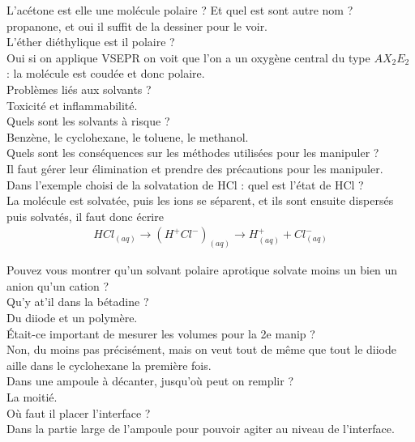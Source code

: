 \documentclass[12pt,prb,aps,epsf]{article}
\begin{document}
L'acétone est elle une molécule polaire ? Et quel est sont autre nom ?\\
propanone, et oui il suffit de la dessiner pour le voir.\\

L'éther diéthylique est il polaire ?\\
Oui si on applique VSEPR on voit que l'on a un oxygène central du type $AX_2E_2$ : la molécule est coudée et donc polaire.\\

Problèmes liés aux solvants ?\\
Toxicité et inflammabilité.\\

Quels sont les solvants à risque ?\\
Benzène, le cyclohexane, le toluene, le methanol.\\

Quels sont les conséquences sur les méthodes utilisées pour les manipuler ?\\
Il faut gérer leur élimination et prendre des précautions pour les manipuler.\\

Dans l'exemple choisi de la solvatation de HCl : quel est l'état de HCl ?\\
La molécule est solvatée, puis les ions se séparent, et ils sont ensuite dispersés puis solvatés, il faut donc écrire 
\begin{eqnarray}
HCl_{(aq)} \rightarrow (H^+Cl^-)_{(aq)} \rightarrow H^+_{(aq)} + Cl^-_{(aq)}
\end{eqnarray}

Pouvez vous montrer qu'un solvant polaire aprotique solvate moins un bien un anion qu'un cation ?\\

Qu'y at'il dans la bétadine ?\\ Du diiode et un polymère.\\

Était-ce important de mesurer les volumes pour la 2e manip ?\\
Non, du moins pas précisément, mais on veut tout de même que tout le diiode aille dans le cyclohexane la première fois.\\

Dans une ampoule à décanter, jusqu'où peut on remplir ?\\
La moitié.\\

Où faut il placer l'interface ?\\
Dans la partie large de l'ampoule pour pouvoir agiter au niveau de l'interface.
\end{document}
